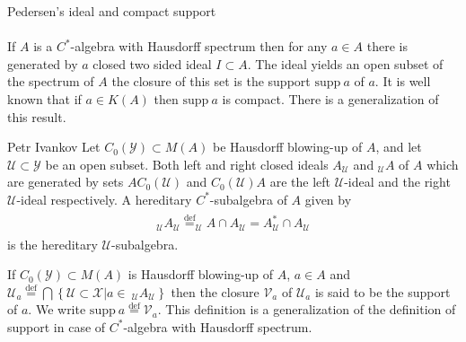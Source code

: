 \documentclass{beamer}
\theoremstyle{plain}
\newcommand{\supp}{\mathrm{supp}}
\newcommand{\sU}{\mathcal{U}}       %
\newcommand{\sV}{\mathcal{V}}       %
\newcommand{\sX}{\mathcal{X}}       %
\newcommand{\sY}{\mathcal{Y}}       %
\newcommand{\bean}{\begin{eqnarray*}}
\newcommand{\eean}{\end{eqnarray*}}
\newcommand{\bydef}{\stackrel{\mathrm{def}}{=}}
\begin{document}
\begin{frame}
\huge{Pedersen's ideal and compact support}\normalsize\\ 
$~$\\	If $A$ is a $C^*$-algebra with Hausdorff spectrum then for any $a\in A$ there is generated by $a$ closed two sided ideal $I\subset A$. The ideal yields an open subset of the spectrum of $A$ the closure of this set is the \alert{support} $\supp~a$ of $a$. It is well known  that if $a \in K\left(A \right)$ then  $\supp~a$ is compact. There is a generalization of this result.
\end{frame}
\begin{frame}
\begin{definition}\label{blowing_ideals_au_ua_defn}\alert{Petr Ivankov}
	Let  $ C_0\left(\sY\right)\subset  M\left( A\right) $ be  Hausdorff blowing-up of $A$, and let $\sU \subset \sY$ be an open subset. Both left and right  closed ideals $A_\sU$  and $_\sU A$ of $A$ which are   generated by sets 	$AC_0\left( \sU\right)$ and $C_0\left( \sU\right)A$ are the \alert{left} $\sU$-\alert{ideal} and the \alert{right} $\sU$-\alert{ideal} respectively. A hereditary $C^*$-subalgebra of $A$ given by
	\bean
	\begin{split}
		_\sU A_\sU \bydef		_\sU A\cap  A_\sU = A^*	_\sU \cap  A_\sU
	\end{split}
	\eean	
	is the \alert{hereditary} $\sU$-\alert{subalgebra}.
	
	\end{definition}
	
	\begin{definition}\label{blowing_support_defn}
		If $C_0\left( \sY\right) \subset M\left(A \right)$ is    {Hausdorff blowing-up} of $A$,  $a \in A$ and
		$
		\sU_a \bydef\bigcap 
		\left\{\left.{\sU} \subset \sX\right| a\in~_\sU A_{\sU} \right\}
		$
		then the  closure $\sV_a$  of $\sU_a$ is said to be the \alert{support} of $a$. We write $\supp~ a \bydef \sV_a$. This definition is a generalization of the definition of support in case of $C^*$-algebra with Hausdorff spectrum. 
	\end{definition}
	
\end{frame}
\end{document}
